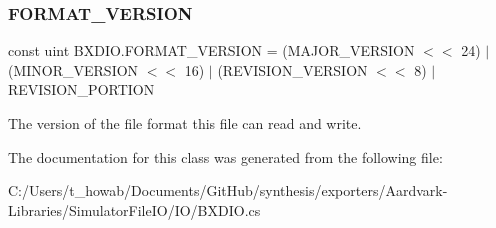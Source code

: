 \subsubsection{\texorpdfstring{F\+O\+R\+M\+A\+T\+\_\+\+V\+E\+R\+S\+I\+ON}{FORMAT\_VERSION}}
{\footnotesize\ttfamily const uint B\+X\+D\+I\+O.\+F\+O\+R\+M\+A\+T\+\_\+\+V\+E\+R\+S\+I\+ON = (M\+A\+J\+O\+R\+\_\+\+V\+E\+R\+S\+I\+ON $<$$<$ 24) $\vert$ (M\+I\+N\+O\+R\+\_\+\+V\+E\+R\+S\+I\+ON $<$$<$ 16) $\vert$ (R\+E\+V\+I\+S\+I\+O\+N\+\_\+\+V\+E\+R\+S\+I\+ON $<$$<$ 8) $\vert$ R\+E\+V\+I\+S\+I\+O\+N\+\_\+\+P\+O\+R\+T\+I\+ON}



The version of the file format this file can read and write. 



The documentation for this class was generated from the following file\+:\begin{DoxyCompactItemize}
\item 
C\+:/\+Users/t\+\_\+howab/\+Documents/\+Git\+Hub/synthesis/exporters/\+Aardvark-\/\+Libraries/\+Simulator\+File\+I\+O/\+I\+O/B\+X\+D\+I\+O.\+cs\end{DoxyCompactItemize}

